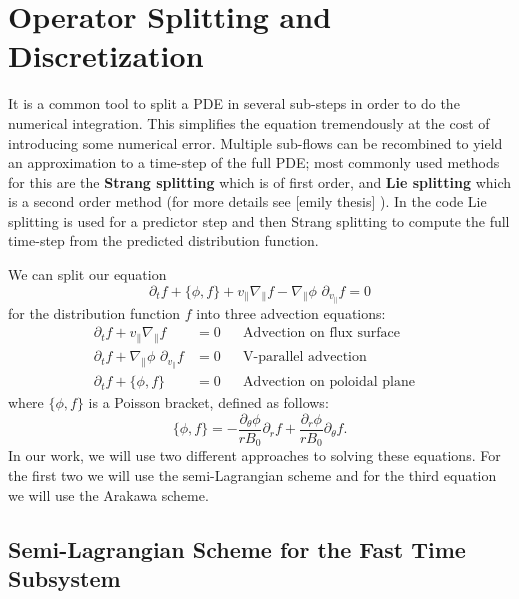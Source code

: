 
\section{Operator Splitting and Discretization}
\label{sec:splitting_discretization}

It is a common tool to split a PDE in several sub-steps in order to do the numerical integration. This simplifies the equation tremendously at the cost of introducing some numerical error. Multiple sub-flows can be recombined to yield an approximation to a time-step of the full PDE; most commonly used methods for this are the \textbf{Strang splitting} which is of first order, and \textbf{Lie splitting} which is a second order method (for more details see [emily thesis] %
). In the code \cite{pygyro_code} Lie splitting is used for a predictor step and then Strang splitting to compute the full time-step from the predicted distribution function.

We can split our equation 
\begin{equation}
 \partial_t f + \{\phi, f \} + v_\parallel \nabla_\parallel f - \nabla_\parallel \phi\,\, \partial_{v_\parallel} f = 0
\end{equation}
for the distribution function $f$ into three advection equations:
\begin{subequations}
	\begin{align}
		\partial_t f + v_\parallel \nabla_\parallel f & = 0 && \text{Advection on flux surface} & \\
		\partial_t f + \nabla_\parallel \phi\,\, \partial_{v_{\parallel}} f & = 0 && \text{V-parallel advection} & \\
		\partial_t f + \{\phi, f\} & = 0 && \text{Advection on poloidal plane} &
	\end{align}
\end{subequations}
where $\{\phi,f\}$ is a Poisson bracket, defined as follows:
\begin{equation}
 \{\phi,f\}=-\frac{\partial_\theta\phi}{rB_0}\partial_r f + \frac{\partial_r\phi}{rB_0}\partial_\theta f.
\end{equation}
In our work, we will use two different approaches to solving these equations. For the first two we will use the semi-Lagrangian scheme and for the third equation we will use the Arakawa scheme.






\subsection{Semi-Lagrangian Scheme for the Fast Time Subsystem}


